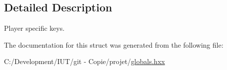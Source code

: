 \subsection{Detailed Description}
Player specific keys. 

The documentation for this struct was generated from the following file\-:\begin{DoxyCompactItemize}
\item 
C\-:/\-Development/\-I\-U\-T/git -\/ Copie/projet/\hyperlink{globals_8hxx}{globals.\-hxx}\end{DoxyCompactItemize}
